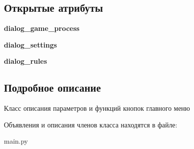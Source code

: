 \subsection*{Открытые атрибуты}
\begin{DoxyCompactItemize}
\item 
\mbox{\label{classmain_1_1_main___window_aaeff37bef709cfc647a7893d220120df}} 
{\bfseries dialog\+\_\+game\+\_\+process}
\item 
\mbox{\label{classmain_1_1_main___window_a49827a51b0671b8941aa78d7d2d57232}} 
{\bfseries dialog\+\_\+settings}
\item 
\mbox{\label{classmain_1_1_main___window_ae5fe228f176a3ca7834d0cf3de67cfa9}} 
{\bfseries dialog\+\_\+rules}
\end{DoxyCompactItemize}


\subsection{Подробное описание}
Класс описания параметров и функций кнопок главного меню 

Объявления и описания членов класса находятся в файле\+:\begin{DoxyCompactItemize}
\item 
main.\+py\end{DoxyCompactItemize}

